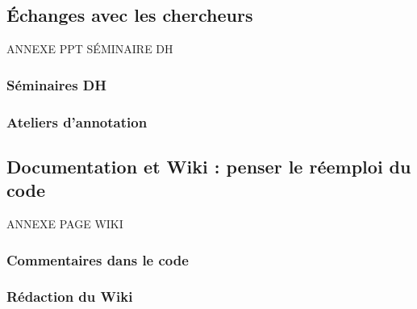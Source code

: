 
\subsection{Échanges avec les chercheurs}
ANNEXE PPT SÉMINAIRE DH
    \subsubsection{Séminaires DH}

    
    \subsubsection{Ateliers d'annotation}

    
    \subsection{Documentation et Wiki : penser le réemploi du code}
    ANNEXE PAGE WIKI
        \subsubsection{Commentaires dans le code}


        \subsubsection{Rédaction du Wiki}

